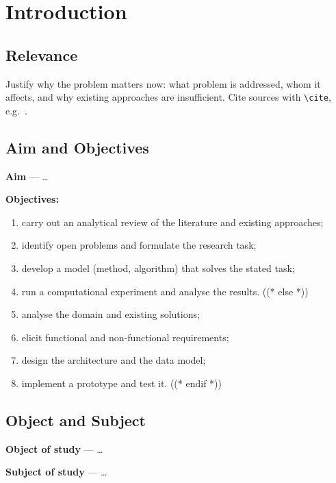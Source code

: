 \documentclass[12pt,a4paper]{extreport}
\begin{document}
\clearpage

\chapter*{Introduction}

\section*{Relevance}
Justify why the problem matters now: what problem is addressed, whom it
affects, and why existing approaches are insufficient. Cite sources with
\verb|\cite|, e.g.~\cite{article}.

\section*{Aim and Objectives}
\textbf{Aim} --- \ldots\ %

\textbf{Objectives:}
\begin{enumerate}[label=\arabic*), leftmargin=1.25cm]
((* if project.kind == 'research' *))
  \item carry out an analytical review of the literature and existing approaches;
  \item identify open problems and formulate the research task;
  \item develop a model (method, algorithm) that solves the stated task;
  \item run a computational experiment and analyse the results.
((* else *))
  \item analyse the domain and existing solutions;
  \item elicit functional and non-functional requirements;
  \item design the architecture and the data model;
  \item implement a prototype and test it.
((* endif *))
\end{enumerate}

\section*{Object and Subject}
\textbf{Object of study} --- \ldots

\textbf{Subject of study} --- \ldots
\end{document}

